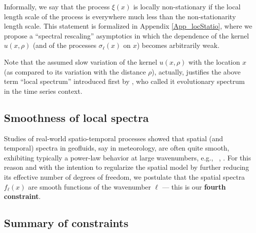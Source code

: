 \documentclass[12pt]{article}
\newcommand{\eg}{e.g.,\ }
\begin{document}
Informally, we say that the process $\xi(x)$ is locally non-stationary if 
the local length scale of the process is everywhere much less than the non-stationarity length scale.
This statement is formalized in Appendix \ref{App_locStatio}, where we 
propose a ``spectral rescaling'' asymptotics in which the dependence of the kernel $u(x,\rho)$ 
(and of the processes $\sigma_\ell(x)$ on $x$)
becomes arbitrarily weak.

Note that the assumed slow variation of the kernel $u(x,\rho)$  with the location $x$ 
(as compared to its variation with the distance $\rho$), 
 actually, justifies the above term
``local spectrum'' introduced first by \citet{Priestley,Priestley1988}, who called it
evolutionary spectrum in the time series context.





\subsection {Smoothness of local spectra}
\label{sec_smoo_spec}





Studies of real-world spatio-temporal processes 
showed that spatial (and temporal) spectra in geofluids, say in meteorology,
are often quite smooth, exhibiting typically a power-law behavior at large wavenumbers, \eg
\citet[][]{GageNastrom}, \citet[][]{Trenberth}.
For this reason and with the intention to regularize the spatial model
by further reducing its effective number of degrees of freedom, we postulate that 
the spatial spectra $f_\ell(x)$ are smooth %
functions of the wavenumber $\ell$ --- this is our {\bf fourth  constraint}.




\subsection {Summary of constraints}
\label{sec_constr}
\end{document}
